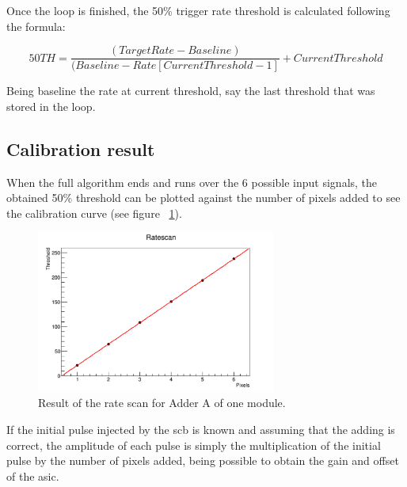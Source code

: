\documentclass[main.tex]{subfiles}
\begin{document}
Once the loop is finished, the 50\% trigger rate threshold is calculated following the formula:

\begin{equation}
  50TH = \frac{(Target Rate-Baseline)}{(Baseline-Rate[Current Threshold-1]} + Current Threshold
\end{equation}

Being baseline the rate at current threshold, say the last threshold that was stored in the loop.

\subsection{Calibration result}

When the full algorithm ends and runs over the 6 possible input signals, the obtained 50\% threshold can be plotted against the number of pixels added to see the calibration curve (see figure ~\ref{fig:calibcurve}).

\begin{figure}[h]
  \centering
  \includegraphics[width=0.7\textwidth]{./Pictures/calibcurve.pdf}
  \caption{Result of the rate scan for Adder A of one module.}
  \label{fig:calibcurve}
\end{figure}

If the initial pulse injected by the \gls{scb} is known and assuming that the adding is correct, the amplitude of each pulse is simply the multiplication of the initial pulse by the number of pixels added, being possible to obtain the gain and offset of the \gls{asic}.
\end{document}
